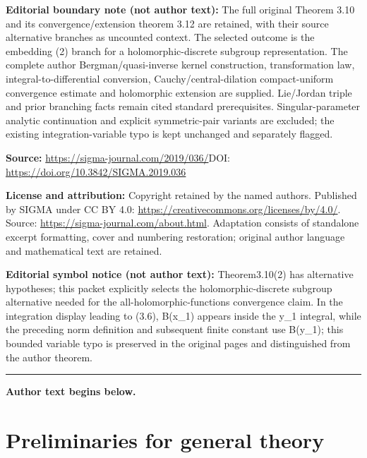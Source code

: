 \documentclass[11pt]{article}
\numberwithin{equation}{section}
\begin{document}
\noindent\textbf{Editorial boundary note (not author text):} The full original Theorem 3.10 and its convergence/extension theorem 3.12 are retained, with their source alternative branches as uncounted context. The selected outcome is the embedding (2) branch for a holomorphic-discrete subgroup representation. The complete author Bergman/quasi-inverse kernel construction, transformation law, integral-to-differential conversion, Cauchy/central-dilation compact-uniform convergence estimate and holomorphic extension are supplied. Lie/Jordan triple and prior branching facts remain cited standard prerequisites. Singular-parameter analytic continuation and explicit symmetric-pair variants are excluded; the existing integration-variable typo is kept unchanged and separately flagged.\par
\noindent\textbf{Source:} \url{https://sigma-journal.com/2019/036/}\quad DOI: \url{https://doi.org/10.3842/SIGMA.2019.036}\par
\noindent\textbf{License and attribution:} Copyright retained by the named authors. Published by SIGMA under CC BY 4.0: \url{https://creativecommons.org/licenses/by/4.0/}. Source: \url{https://sigma-journal.com/about.html}. Adaptation consists of standalone excerpt formatting, cover and numbering restoration; original author language and mathematical text are retained.\par
\noindent\textbf{Editorial symbol notice (not author text):} Theorem3.10(2) has alternative hypotheses; this packet explicitly selects the holomorphic-discrete subgroup alternative needed for the all-holomorphic-functions convergence claim. In the integration display leading to (3.6), B(x\_1) appears inside the y\_1 integral, while the preceding norm definition and subsequent finite constant use B(y\_1); this bounded variable typo is preserved in the original pages and distinguished from the author theorem.\par
\medskip\hrule\medskip\noindent\textbf{Author text begins below.}\par
\setcounter{section}{1}
\setcounter{subsection}{0}
\setcounter{subsubsection}{0}
\setcounter{Theorem}{0}
\setcounter{equation}{2}
\section{Preliminaries for general theory}\label{section2}
\end{document}
